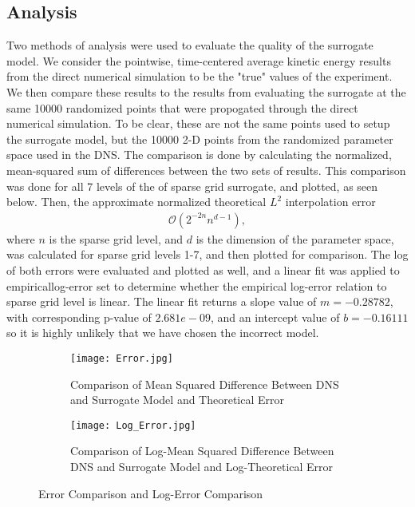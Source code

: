 \documentclass{article}
\begin{document}
\subsection{Analysis}
Two methods of analysis were used to evaluate the quality of the surrogate model. We consider the pointwise, time-centered average kinetic energy results from the direct numerical simulation to be the "true" values of the experiment. We then compare these results to the results from evaluating the surrogate at the same 10000 randomized points that were propogated through the direct numerical simulation. To be clear, these are not the same points used to setup the surrogate model, but the 10000 2-D points from the randomized parameter space used in the DNS. The comparison is done by calculating the normalized, mean-squared sum of differences between the two sets of results. This comparison was done for all 7 levels of the of sparse grid surrogate, and plotted, as seen below. Then, the approximate normalized theoretical $L^2$ interpolation error 
\begin{align*}
\mathcal{O}(2^{-2n}n^{d-1}),
\end{align*}
where $n$ is the sparse grid level, and $d$ is the dimension of the parameter space, was calculated for sparse grid levels 1-7, and then plotted for comparison. The log of both errors were evaluated and plotted as well, and a linear fit was applied to empiricallog-error set to determine whether the empirical log-error relation to sparse grid level is linear.  The linear fit returns a slope value of $m= -0.28782$, with corresponding p-value of $2.681e-09$, and an intercept value of $b = -0.16111$so it is highly unlikely that we have chosen the incorrect model.
\begin{figure}[h!]
	\centering
		\begin{subfigure}[b]{0.45\linewidth}
			\texttt{[image: Error.jpg]}
			\caption{Comparison of Mean Squared Difference Between DNS and Surrogate Model and Theoretical Error}
		\end{subfigure}
		\begin{subfigure}[b]{0.45\linewidth}
			\texttt{[image: Log\_Error.jpg]}
			\caption{Comparison of Log-Mean Squared Difference Between DNS and Surrogate Model and Log-Theoretical Error}
		\end{subfigure}
		\caption{Error Comparison and Log-Error Comparison}
		\label{fig:error}
\end{figure}
\end{document}
